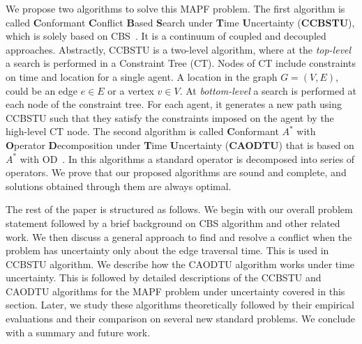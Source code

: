 \documentclass{article}
\newcommand{\todo}[1]{\textbf{\color{ToDoColor} TODO: #1}}
\begin{document}

%

We propose two algorithms to solve this MAPF problem. 
The first algorithm is called \textbf{C}onformant \textbf{C}onflict \textbf{B}ased \textbf{S}earch under \textbf{T}ime \textbf{U}ncertainty (\textbf{CCBSTU}), which is solely based on CBS~\cite{SharonSFS12}. 
It is a continuum of coupled and decoupled approaches.
%
%
Abstractly, CCBSTU is a two-level algorithm, where at the \emph{top-level} a search is performed in a Constraint Tree (CT). 
Nodes of CT include constraints on time and location for a single agent. A location in the graph $G = (V,E)$, could be an edge $e \in E$ or a vertex $v \in V$. 
At \emph{bottom-level} a search is performed at each node of the constraint tree.
For each agent, it generates a new path using CCBSTU such that they satisfy the constraints imposed on the agent by the high-level CT node.  
%
The second algorithm is called 
\textbf{C}onformant ${A}^*$ with  
\textbf{O}perator \textbf{D}ecomposition under \textbf{T}ime 
\textbf{U}ncertainty (\textbf{CAODTU}) that is based on $A^*$ with OD~\cite{Standley10}. 
In this algorithms a standard operator is decomposed into series of operators. 
We prove that our proposed algorithms are sound and complete, and solutions obtained through them are always optimal.

The rest of the paper is structured as follows. We begin with our overall problem statement followed by a brief background on CBS algorithm and other related work. We then discuss a general approach to find and resolve a conflict when the problem has uncertainty only about the edge traversal time. 
This is used in CCBSTU algorithm. We describe how the CAODTU algorithm works under time uncertainty. This is followed by detailed descriptions of the CCBSTU and CAODTU algorithms for the MAPF problem under uncertainty covered in this section. 
Later, we study these algorithms theoretically followed by their empirical evaluations and their comparison on several new standard problems. We conclude with a summary and future work.
\end{document}
